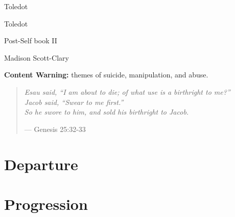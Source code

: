 \documentclass[11pt]{memoir}
\begin{document}
  \frontmatter

  \thispagestyle{empty}
  \null
  \vfill
  \begin{flushright}
    \DisplayFont Toledot
  \end{flushright}
  \vfill
  \cleardoublepage

  \pagestyle{plain}

  \doublespacing

  \begin{flushright}
    \null
    \vfill
    {\Huge\DisplayFont Toledot}

    {\DisplayFont Post-Self book II}

    \vfill

    {\Large\DisplayFont Madison Scott-Clary}
  \end{flushright}
  \thispagestyle{empty}

  \newpage

  

  \newpage
  \null
  \thispagestyle{empty}
  \cleardoublepage



  \null
  \thispagestyle{empty}
  \vfill

  \noindent\textbf{Content Warning:} themes of suicide, manipulation, and abuse.
  \mainmatter

  \pagestyle{ourbook}

  \cleardoublepage
  \null
  \thispagestyle{empty}
  \vfill
  \begin{quote}
    \small
    \emph{Esau said, ``I am about to die; of what use is a birthright to me?'' \\
    Jacob said, ``Swear to me first.'' \\
    So he swore to him, and sold his birthright to Jacob.}

    --- Genesis 25:32-33
  \end{quote}
  \vfill

  \part{Departure}
  

  \part{Progression}
  
\end{document}
